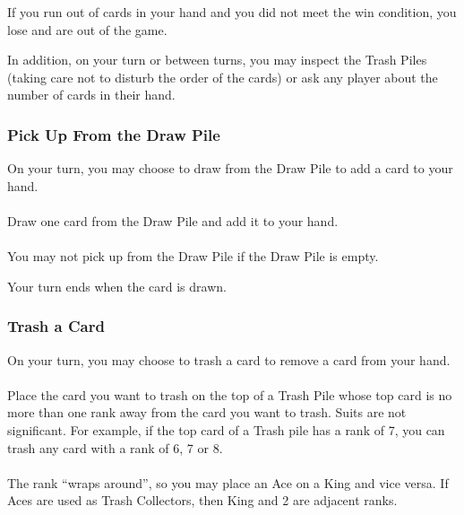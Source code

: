 \documentclass{article}
\begin{document}
If you run out of cards in your hand and you did not meet the win condition, you lose and are out of the game.

In addition, on your turn or between turns, you may inspect the Trash Piles (taking care not to disturb the order of the cards) or ask any player about the number of cards in their hand.

\subsubsection{Pick Up From the Draw Pile}
\label{sec:draw}

On your turn, you may choose to draw from the Draw Pile to add a card to your hand.

\paragraph{} \label{par:drawnormal}
Draw one card from the Draw Pile and add it to your hand.

\paragraph{} \label{par:drawempty}
You may not pick up from the Draw Pile if the Draw Pile is empty.

Your turn ends when the card is drawn.

\subsubsection{Trash a Card}
\label{sec:trashcard}

On your turn, you may choose to trash a card to remove a card from your hand.

\paragraph{} \label{par:trashvalid}
Place the card you want to trash on the top of a Trash Pile whose top card is no more than one rank away from the card you want to trash. Suits are not significant. For example, if the top card of a Trash pile has a rank of 7, you can trash any card with a rank of 6, 7 or 8.

\paragraph{} \label{par:trashwraparound}
The rank ``wraps around'', so you may place an Ace on a King and vice versa. If Aces are used as Trash Collectors, then King and 2 are adjacent ranks.
\end{document}
